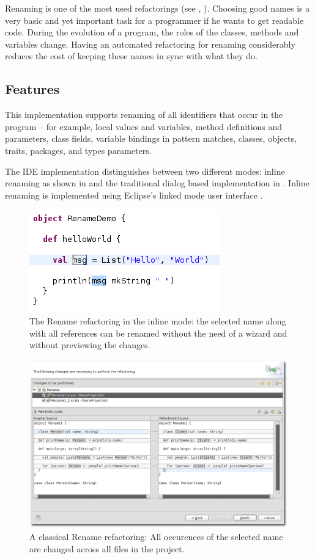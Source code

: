 \documentclass[10pt,a4paper,oneside]{scrreprt}
\begin{document}
Renaming is one of the most used refactorings (see \cite{RefactoringStudy}, \cite{RefactoringInEclipse}). Choosing good names is a very basic and yet important task for a programmer if he wants to get readable code. During the evolution of a program, the roles of the classes, methods and variables change. Having an automated refactoring for renaming considerably reduces the cost of keeping these names in sync with what they do.

\subsection{Features}

This implementation supports renaming of all identifiers that occur in the program -- for example, local values and variables, method definitions and parameters, class fields, variable bindings in pattern matches, classes, objects, traits, packages, and types parameters.

The IDE implementation distinguishes between two different modes: inline renaming as shown in  and the traditional dialog based implementation in . Inline renaming is implemented using Eclipse's linked mode user interface \cite{LinkedUI}.

\begin{figure}
  \centering
  \includegraphics[width=0.5\linewidth]{rename_screenshot_1.png}
  \caption{The Rename refactoring in the inline mode: the selected name along with all references can be renamed without the need of a wizard and without previewing the changes.}
  \label{figure:rename-screenshot-1}
\end{figure}

\begin{figure}
  \centering
  \includegraphics[width=\linewidth]{rename_screenshot_2.png}
  \caption{A classical Rename refactoring: All occurences of the selected name are changed across all files in the project.}
  \label{figure:rename-screenshot-2}
\end{figure}
\end{document}
